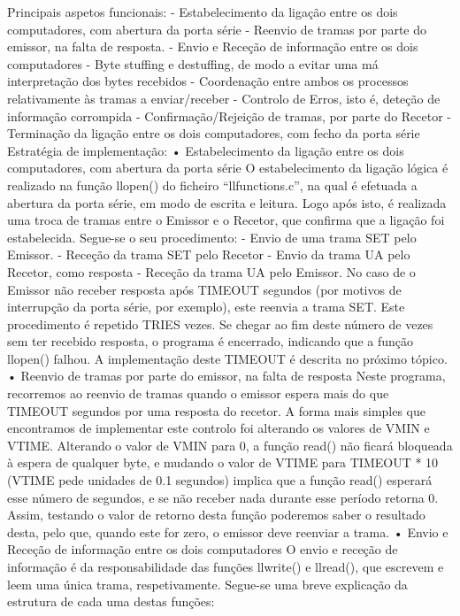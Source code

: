 \documentclass[article, a4paper, 11pt, oneside]{memoir}
\begin{document}
Principais aspetos funcionais:
 - Estabelecimento da ligação entre os dois computadores, com abertura da porta série
 - Reenvio de tramas por parte do emissor, na falta de resposta.
 - Envio e Receção de informação entre os dois computadores
 - Byte stuffing e destuffing, de modo a evitar uma má interpretação dos bytes recebidos
 - Coordenação entre ambos os processos relativamente às tramas a enviar/receber
 - Controlo de Erros, isto é, deteção de informação corrompida
 - Confirmação/Rejeição de tramas, por parte do Recetor
 - Terminação da ligação entre os dois computadores, com fecho da porta série
Estratégia de implementação:
•	Estabelecimento da ligação entre os dois computadores, com abertura da porta série
O estabelecimento da ligação lógica é realizado na função llopen() do ficheiro “llfunctions.c”, na qual é efetuada a abertura da porta série, em modo de escrita e leitura. Logo após isto, é realizada uma troca de tramas entre o Emissor e o Recetor, que confirma que a ligação foi estabelecida. Segue-se o seu procedimento:
 - Envio de uma trama SET pelo Emissor.
 - Receção da trama SET pelo Recetor
 - Envio da trama UA pelo Recetor, como resposta
 - Receção da trama UA pelo Emissor. No caso de o Emissor não receber resposta após TIMEOUT segundos (por motivos de interrupção da porta série, por exemplo), este reenvia a trama SET. Este procedimento é repetido TRIES vezes. Se chegar ao fim deste número de vezes sem ter recebido resposta, o programa é encerrado, indicando que a função llopen() falhou. A implementação deste TIMEOUT é descrita no próximo tópico.
•	Reenvio de tramas por parte do emissor, na falta de resposta
Neste programa, recorremos ao reenvio de tramas quando o emissor espera mais do que TIMEOUT segundos por uma resposta do recetor. A forma mais simples que encontramos de implementar este controlo foi alterando os valores de VMIN e VTIME. Alterando o valor de VMIN para 0, a função read() não ficará bloqueada à espera de qualquer byte, e mudando o valor de VTIME para TIMEOUT * 10 (VTIME pede unidades de 0.1 segundos) implica que a função read() esperará esse número de segundos, e se não receber nada durante esse período retorna 0. Assim, testando o valor de retorno desta função poderemos saber o resultado desta, pelo que, quando este for zero, o emissor deve reenviar a trama.
•	Envio e Receção de informação entre os dois computadores
O envio e receção de informação é da responsabilidade das funções llwrite() e llread(), que escrevem e leem uma única trama, respetivamente. Segue-se uma breve explicação da estrutura de cada uma destas funções:
\end{document}
